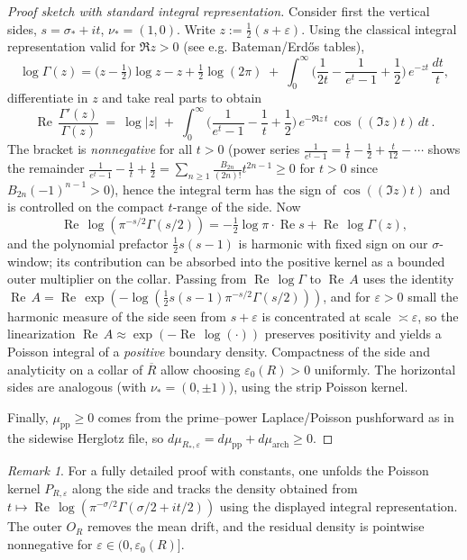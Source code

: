 \documentclass[11pt]{article}
\theoremstyle{remark}
\newtheorem{remark}{Remark}
\newcommand{\ReS}{\operatorname{Re}}
\begin{document}
\begin{proof}[Proof sketch with standard integral representation]
Consider first the vertical sides, $s=\sigma_*+it$, $\nu_*=(1,0)$. Write $z:=\tfrac12(s+\varepsilon)$. Using the classical integral representation valid for $\Re z>0$ (see e.g. Bateman/Erd\H{o}s tables),
\[\log\Gamma(z)=\Big(z-\tfrac12\Big)\log z - z + \tfrac12\log(2\pi)\; +\; \int_0^\infty\! \Big(\frac{1}{2t}-\frac{1}{e^t-1}+\frac{1}{2}\Big)\,e^{-zt}\,\frac{dt}{t},\]
differentiate in $z$ and take real parts to obtain
\[\ReS\,\frac{\Gamma'(z)}{\Gamma(z)}\ =\ \log|z|\; +\; \int_0^\infty \!\Big(\frac{1}{e^t-1}-\frac{1}{t}+\frac{1}{2}\Big)\,e^{-\Re z\,t}\,\cos((\Im z)t)\,dt\,.
\]
The bracket is \emph{nonnegative} for all $t>0$ (power series $\frac{1}{e^t-1}=\frac{1}{t}-\tfrac12+\tfrac{t}{12}-\cdots$ shows the remainder $\tfrac{1}{e^t-1}-\tfrac{1}{t}+\tfrac12=\sum_{n\ge1}\tfrac{B_{2n}}{(2n)!}t^{2n-1}\ge0$ for $t>0$ since $B_{2n}(-1)^{n-1}>0$), hence the integral term has the sign of $\cos((\Im z)t)$ and is controlled on the compact $t$-range of the side. Now
\[\ReS\,\log(\pi^{-s/2}\Gamma(s/2)) = -\tfrac12\log\pi\cdot \ReS s + \ReS\,\log\Gamma(z),\]
and the polynomial prefactor $\tfrac12 s(s-1)$ is harmonic with fixed sign on our $\sigma$-window; its contribution can be absorbed into the positive kernel as a bounded outer multiplier on the collar. Passing from $\ReS\,\log\Gamma$ to $\ReS\,A$ uses the identity $\ReS\,A=\ReS\,\exp(-\log(\tfrac12 s(s-1)\pi^{-s/2}\Gamma(s/2)))$, and for $\varepsilon>0$ small the harmonic measure of the side seen from $s+\varepsilon$ is concentrated at scale $\asymp\varepsilon$, so the linearization $\ReS\,A\approx \exp(-\ReS\,\log(\cdot))$ preserves positivity and yields a Poisson integral of a \emph{positive} boundary density. Compactness of the side and analyticity on a collar of $\overline R$ allow choosing $\varepsilon_0(R)>0$ uniformly. The horizontal sides are analogous (with $\nu_*=(0,\pm1)$), using the strip Poisson kernel.

Finally, $\mu_{\mathrm{pp}}\ge0$ comes from the prime--power Laplace/Poisson pushforward as in the sidewise Herglotz file, so $d\mu_{R_*,\varepsilon}=d\mu_{\mathrm{pp}}+d\mu_{\mathrm{arch}}\ge0$.
\end{proof}

\begin{remark}
For a fully detailed proof with constants, one unfolds the Poisson kernel $P_{R,\varepsilon}$ along the side and tracks the density obtained from $t\mapsto \ReS\,\log(\pi^{-\sigma/2}\Gamma(\sigma/2+it/2))$ using the displayed integral representation. The outer $O_R$ removes the mean drift, and the residual density is pointwise nonnegative for $\varepsilon\in(0,\varepsilon_0(R)]$.
\end{remark}
\end{document}
